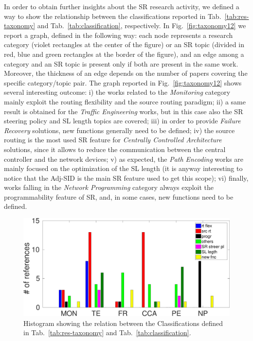 In order to obtain further insights about the SR research activity, we defined a way to show the relationship between the classifications reported in Tab.~\ref{tab:res-taxonomy} and Tab.~\ref{tab:classification}, respectively. In Fig.~\ref{fig:taxonomy12} we report a graph, defined in the following way: each node represents a research category (violet rectangles at the center of the figure) or an SR topic (divided in red, blue and green rectangles at the border of the figure), and an edge among a category and an SR topic is present only if both are present in the same work. Moreover, the thickness of an edge depends on the number of papers covering the specific category/topic pair. The graph reported in Fig.~\ref{fig:taxonomy12} shows several interesting outcome: i) the works related to the \emph{Monitoring} category mainly exploit the routing flexibility and the source routing paradigm; ii) a same result is obtained for the \emph{Traffic Engineering} works, but in this case also the SR steering policy and SL length topics are covered; iii) in order to provide \emph{Failure Recovery} solutions, new functions generally need to be defined; iv) the source routing is the most used SR feature for \emph{Centrally Controlled Architecture} solutions, since it allows to reduce the communication between the central controller and the network devices; v) as expected, the \emph{Path Encoding}  works are mainly focused on the optimization of the SL length (it is anyway interesting to notice that the Adj-SID is the main SR feature used to get this scope); vi) finally, works falling in the \emph{Network Programming} category always exploit the programmability feature of SR, and, in some cases, new functions need to be defined.

\begin{figure}
    \centering
    \includegraphics[width=1\columnwidth]{fig/taxonomy_1-2c.pdf}
    \caption{Histogram showing the relation between the Classifications defined in Tab.~\ref{tab:res-taxonomy} and Tab.~\ref{tab:classification}.}
    \label{fig:taxonomy12b}
\end{figure}

